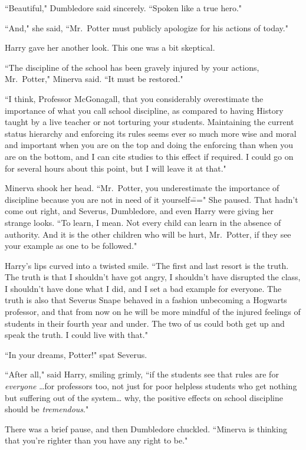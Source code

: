 ``Beautiful," Dumbledore said sincerely. ``Spoken like a true hero."

``And," she said, ``Mr.~Potter must publicly apologize for his actions of today."

Harry gave her another look. This one was a bit skeptical.

``The discipline of the school has been gravely injured by your actions, Mr.~Potter," Minerva said. ``It must be restored."

``I think, Professor McGonagall, that you considerably overestimate the importance of what you call school discipline, as compared to having History taught by a live teacher or not torturing your students. Maintaining the current status hierarchy and enforcing its rules seems ever so much more wise and moral and important when you are on the top and doing the enforcing than when you are on the bottom, and I can cite studies to this effect if required. I could go on for several hours about this point, but I will leave it at that."

Minerva shook her head. ``Mr.~Potter, you underestimate the importance of discipline because you are not in need of it yourself\===" She paused. That hadn't come out right, and Severus, Dumbledore, and even Harry were giving her strange looks. ``To learn, I mean. Not every child can learn in the absence of authority. And it is the other children who will be hurt, Mr.~Potter, if they see your example as one to be followed."

Harry's lips curved into a twisted smile. ``The first and last resort is the truth. The truth is that I shouldn't have got angry, I shouldn't have disrupted the class, I shouldn't have done what I did, and I set a bad example for everyone. The truth is also that Severus Snape behaved in a fashion unbecoming a Hogwarts professor, and that from now on he will be more mindful of the injured feelings of students in their fourth year and under. The two of us could both get up and speak the truth. I could live with that."

``In your dreams, Potter!" spat Severus.

``After all," said Harry, smiling grimly, ``if the students see that rules are for \emph{everyone} {\ldots}for professors too, not just for poor helpless students who get nothing but suffering out of the system{\ldots} why, the positive effects on school discipline should be \emph{tremendous}."

There was a brief pause, and then Dumbledore chuckled. ``Minerva is thinking that you're righter than you have any right to be."

